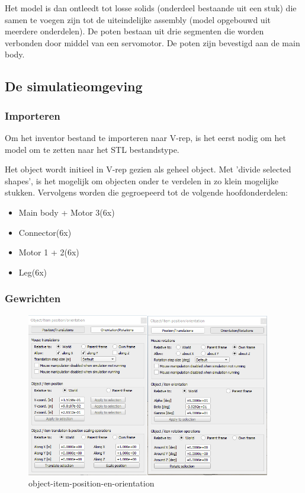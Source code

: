 \documentclass[10pt,a4paper]{article}
\begin{document}
Het model is dan ontleedt tot losse solids (onderdeel bestaande uit een stuk) die samen te voegen zijn tot de uiteindelijke assembly (model opgebouwd uit meerdere onderdelen). De poten bestaan uit drie segmenten die worden verbonden door middel van een servomotor. De poten zijn bevestigd aan de main body. \\



\subsection{De simulatieomgeving}
\subsubsection{Importeren}
Om het inventor bestand te importeren naar V-rep, is het eerst nodig om het model om te zetten naar het STL bestandstype.

Het object wordt initieel in V-rep gezien als geheel object. Met 'divide selected shapes', is het mogelijk om objecten onder te verdelen in zo klein mogelijke stukken. Vervolgens worden die gegroepeerd tot de volgende hoofdonderdelen:

\begin{itemize}
\item Main body + Motor 3(6x)
\item Connector(6x)
\item Motor 1 + 2(6x)
\item Leg(6x)
\end{itemize}

\subsubsection{Gewrichten}

\begin{figure}[h]
    \centering
    \includegraphics[width=0.95\textwidth]{object-item-position-en-orientation}
    \caption{object-item-position-en-orientation}
    \label{fig:object-item-position-en-orientation}
\end{figure}
\end{document}
